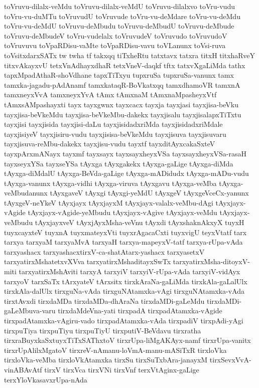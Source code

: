 {toVruvu-dilalx-veMdu
toVruvu-dilalx-veMdU
toVruvu-dilalxvo
toVru-vudu
toVru-vu-duMTu
toVruvudU
toVruvude
toVru-vu-deMdare
toVru-vu-deMdu
toVru-vu-deMdU
toVruvu-deMbudu
toVruvu-deMbudU
toVruvu-deMbude
toVruvu-deMbudeV
toVru-vudelalx
toVruvudeV
toVruvudo
toVruvudoV
toVruvuvu
toVpaRDisu-vaMte
toVpaRDisu-vavu
toVLanunx
toVsi-ruva
toVsitxdarxSATx
tw
twha
tf
takxqq
tiTxheRtu
tatxtavx
tatxra
titxH
titxhaRveY
titxvAkayxvU
tetxVnAdhayxdhaR
tetxVneV-daqkf
tftx
tatxvXgaLiMda
tathx
tapxMpadAthaR-shoVdhane
tapxTiTxyu
tupxruSa
tupxruSa-vanunx
tamx
tamxka-jagadu-pAdAnamf
tamxkataqR-BoVkatxqq
tamxdhamoVR
tamxnA
tamxneyxVvA
tamxneyxYvA
tAmx
tAmxnaM
tAmxnaMpasheyxVtf
tAmxsAMpashayxti
tayx
tayxgwnx
tayxcacx
tayxja
tayxjasi
tayxjisa-beVku
tayxjisa-beVkeMdu
tayxjisa-beVkeMbu-dakekx
tayxjisalu
tayxjisalapxTiTxtu
tayxjisi
tayxjisida
tayxjisi-daLu
tayxjisidadxriMda
tayxjisidadxriMdale
tayxjisiyeV
tayxjisiru-vudu
tayxjisisa-beVkeMdu
tayxjisuva
tayxjisuvaru
tayxjisuva-reMbu-dakekx
tayxjisu-vudu
tayxtf
tayxditAyxcakaSxteV
tayxpArxmANayx
tayxmf
tayxsayx
tayxsayxheyxVSa
tayxsayxheyxVSa-rasaH
tayxseyxYSa
tayxseYSa
tAyxga
tAyxgakekx
tAyxga-gaLige
tAyxga-diMda
tAyxga-diMdalU
tAyxga-BeVda-gaLige
tAyxga-mADidudx
tAyxga-mADu-vudu
tAyxga-vanunx
tAyxga-vidhi
tAyxga-viruva
tAyxgavu
tAyxga-veMba
tAyxga-veMbudanunx
tAyxgaveV
tAyxgi
tAyxgi-yeMdU
tAyxgeV
tAyxgeVceCx-yanunx
tAyxgeV-neYkeV
tAyxjayx
tAyxjayxM
tAyxjayx-valalx-veMbu-dAgi
tAyxjayx-vAgide
tAyxjayx-vAgide-yeMbudu
tAyxjayx-vAgive
tAyxjayx-veMdu
tAyxjayx-veMbudu
tAyxjayxveV
tAyxjAyxMsha-veVnu
tAyxdi
tAyxshaknAkxyX
tuyxH
tuyxcayxteV
tuyxnA
tuyxmateyxVti
tuyxrAgacaCxti
tuyxvigU
teyxVtatf
tarx
tarxya
tarxyaM
tarxyaMvA
tarxyaH
tarxya-mapeyxV-tatf
tarxya-rUpa-vAda
tarxyashacx
tarxyashacxtirxV-ca-shatAtarx-yashacx
tarxyasetxV
tarxyatirxMshatetxvXVva
tarxyatirxMshaditayxSwTx
tarxyatirxMsha-ditoyxV-miti
tarxyatirxMshAviti
tarxyA
tarxyiV
tarxyiV-rUpa-vAda
tarxyiV-vidAyx
tarxyoV
tarxSaTx
tArxyateV
tArxsitx
tirxkAraNa-gaLiMda
tirxkAla-gaLalUlx
tirxkAla-dalUlx
tirxguNa-vAda
tirxguNAtamxka-vAgi
tirxguNAtamxka-vAda
tirxtAvxdi
tirxdaMDa
tirxdaMDa-dhAraNa
tirxdaMDi-gaLeMdu
tirxdaMDi-gaLeMbuva-varu
tirxdaMdeVna-yati
tirxpadA
tirxpadAtamxka-vAgide
tirxpadAtamxka-vAgiru-vado
tirxpadAtamxka-vAda
tirxpadiV
tirxpAdi-yAgi
tirxpuTiya
tirxpuTiyu
tirxpuTiyU
tirxputiV-BeVdavu
tirxratha
tirxraBuyxkaSxtuyxTiTxSAThxtoV
tirxrUpa-liMgAKAyx-namf
tirxrUpa-vanitx
tirxrUpAlilxMgatoV
tirxreV-nAmanu-loVmA-manu-mASiTxR
tirxloVka
tirxloVka-veMba
tirxloVkAtamxka
tirxSu
tirxSuTxbAra-janayxM
tirxSevxVvA-vinABAvAtf
tirxV
tirxVca
tirxVNi
tirxVnf
terxVtAginx-gaLige
terxYloVkasavxrUpa-nAda
}

